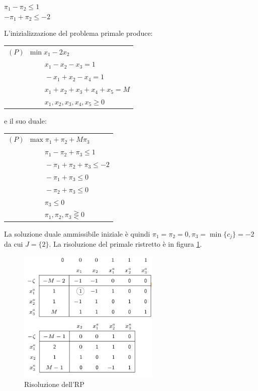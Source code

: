 \documentclass[11pt]{book}
\begin{document}
\begin{center}
$\pi_1 - \pi_2 \leq 1$ \\
$-\pi_1 + \pi_2 \leq -2$
\end{center}

L'inizializzazione del problema primale produce:

\vspace{11pt}
\begin{center}
\begin{tabular}{l}
$(P)\phantom{a}\min x_1-2x_2$ \\
$\phantom{(P)amina}x_1-x_2-x_3 = 1$\\
$\phantom{(P)amina}-x_1+x_2-x_4 = 1$\\
$\phantom{(P)amina}x_1 + x_2 + x_3  + x_4 + x_5 = M$\\
$\phantom{(P)amina}x_1, x_2, x_3, x_4, x_5 \geq 0$
\end{tabular}
\end{center}
\vspace{11pt}

e il suo duale:

\vspace{11pt}
\begin{center}
\begin{tabular}{l}
$(P)\phantom{a}\max \pi_1 + \pi_2 + M\pi_3$ \\
$\phantom{(P)amina}\pi_1 - \pi_2 + \pi_3 \leq 1$\\
$\phantom{(P)amina}-\pi_1 + \pi_2 + \pi_3 \leq -2$\\
$\phantom{(P)amina}-\pi_1 + \pi_3 \leq 0$\\
$\phantom{(P)amina}-\pi_2 + \pi_3 \leq 0$\\
$\phantom{(P)amina}\pi_3 \leq 0$\\
$\phantom{(P)amina}\pi_1,\pi_2,\pi_3 \gtreqless 0$
\end{tabular}
\end{center}
\vspace{11pt}

La soluzione duale ammissibile iniziale \`e quindi $\pi_1 = \pi_2 = 0,
\pi_3 = \min \{ c_j\} = -2$ da cui $J = \{ 2\}$. La risoluzione del
primale ristretto \`e in figura \ref{cap5tab512}.

\begin{figure}[h!]
  \centering
  \includegraphics[width=0.6\textwidth]{images/cap5tab512.png}
  \caption{Risoluzione dell'RP}
  \label{cap5tab512}
\end{figure}
\end{document}
